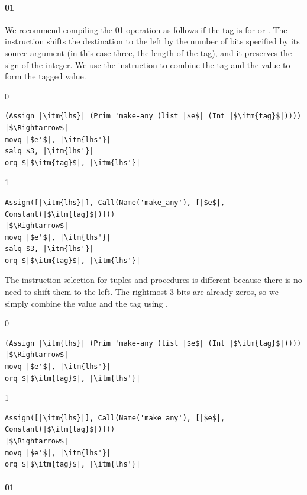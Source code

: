 \documentclass[7x10]{TimesAPriori_MIT}%
\def\racketEd{0}
\def\pythonEd{1}
\def\edition{1}
\newcommand{\racket}[1]{{\if\edition\racketEd{#1}\fi}}
\newcommand{\pythonColor}[0]{}
\newcommand{\python}[1]{{\if\edition\pythonEd\pythonColor #1\fi}}
\numberwithin{theorem}{chapter}
\numberwithin{definition}{chapter}
\numberwithin{equation}{chapter}
\begin{document}
\paragraph{\racket{}\python{}}

We recommend compiling the
\racket{}\python{} operation as follows
if the tag is for \INTTY{} or \BOOLTY{}.  The  instruction
shifts the destination to the left by the number of bits specified by its
source argument (in this case three, the length of the tag), and it
preserves the sign of the integer. We use the  instruction to
combine the tag and the value to form the tagged value. 

{\if\edition\racketEd
\begin{lstlisting}
(Assign |\itm{lhs}| (Prim 'make-any (list |$e$| (Int |$\itm{tag}$|))))
|$\Rightarrow$|
movq |$e'$|, |\itm{lhs'}|
salq $3, |\itm{lhs'}|
orq $|$\itm{tag}$|, |\itm{lhs'}|
\end{lstlisting}
\fi}
%
{\if\edition\pythonEd\pythonColor
\begin{lstlisting}
Assign([|\itm{lhs}|], Call(Name('make_any'), [|$e$|, Constant(|$\itm{tag}$|)]))
|$\Rightarrow$|
movq |$e'$|, |\itm{lhs'}|
salq $3, |\itm{lhs'}|
orq $|$\itm{tag}$|, |\itm{lhs'}|
\end{lstlisting}
\fi}
%
The instruction selection for
tuples and procedures is different because there is no need to shift
them to the left. The rightmost 3 bits are already zeros, so we simply
combine the value and the tag using .  \\
%
{\if\edition\racketEd
\begin{center}
\begin{minipage}{\textwidth}
\begin{lstlisting}
(Assign |\itm{lhs}| (Prim 'make-any (list |$e$| (Int |$\itm{tag}$|))))
|$\Rightarrow$|
movq |$e'$|, |\itm{lhs'}|
orq $|$\itm{tag}$|, |\itm{lhs'}|
\end{lstlisting}
\end{minipage}
\end{center}
\fi}
%
{\if\edition\pythonEd\pythonColor
\begin{lstlisting}
Assign([|\itm{lhs}|], Call(Name('make_any'), [|$e$|, Constant(|$\itm{tag}$|)]))
|$\Rightarrow$|
movq |$e'$|, |\itm{lhs'}|
orq $|$\itm{tag}$|, |\itm{lhs'}|
\end{lstlisting}
\fi}

\paragraph{\racket{}\python{}}
\end{document}
